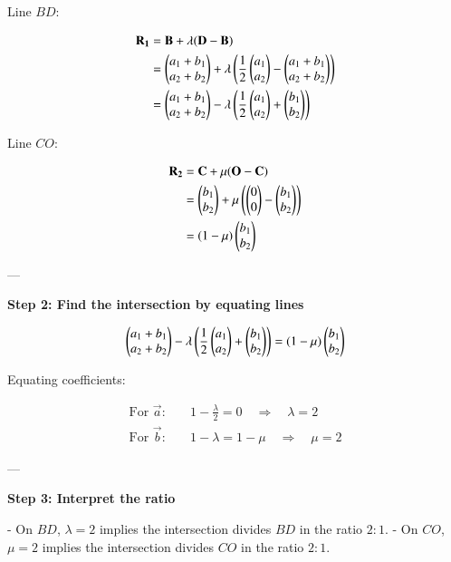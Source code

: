 \documentclass[journal]{IEEEtran}
\begin{document}
Line $BD$:

\begin{align}
\mathbf{R_1} &= \mathbf{B} + \lambda (\mathbf{D} - \mathbf{B}) \\
&= \begin{pmatrix}a_1 + b_1\\a_2 + b_2\end{pmatrix} + \lambda \left(\frac{1}{2} \begin{pmatrix}a_1\\a_2\end{pmatrix} - \begin{pmatrix}a_1 + b_1\\a_2 + b_2\end{pmatrix}\right) \\
&= \begin{pmatrix}a_1 + b_1\\a_2 + b_2\end{pmatrix} - \lambda \left(\frac{1}{2} \begin{pmatrix}a_1\\a_2\end{pmatrix} + \begin{pmatrix}b_1\\b_2\end{pmatrix}\right)
\end{align}

Line $CO$:

\begin{align}
\mathbf{R_2} &= \mathbf{C} + \mu (\mathbf{O} - \mathbf{C}) \\
&= \begin{pmatrix}b_1\\b_2\end{pmatrix} + \mu \left(\begin{pmatrix}0\\0\end{pmatrix} - \begin{pmatrix}b_1\\b_2\end{pmatrix}\right) \\
&= (1 - \mu) \begin{pmatrix}b_1\\b_2\end{pmatrix}
\end{align}

---

\textbf{Step 2: Find the intersection by equating lines}

\begin{align}
\begin{pmatrix}a_1 + b_1\\a_2 + b_2\end{pmatrix} - \lambda \left(\frac{1}{2} \begin{pmatrix}a_1\\a_2\end{pmatrix} + \begin{pmatrix}b_1\\b_2\end{pmatrix}\right) = (1 - \mu) \begin{pmatrix}b_1\\b_2\end{pmatrix}
\end{align}

Equating coefficients:

\begin{align}
\text{For } \vec{a}: & \quad 1 - \frac{\lambda}{2} = 0 \quad \Rightarrow \quad \lambda = 2 \\
\text{For } \vec{b}: & \quad 1 - \lambda = 1 - \mu \quad \Rightarrow \quad \mu = 2
\end{align}

---

\textbf{Step 3: Interpret the ratio}

- On $BD$, $\lambda = 2$ implies the intersection divides $BD$ in the ratio $2:1$.  
- On $CO$, $\mu = 2$ implies the intersection divides $CO$ in the ratio $2:1$.  
\end{document}
